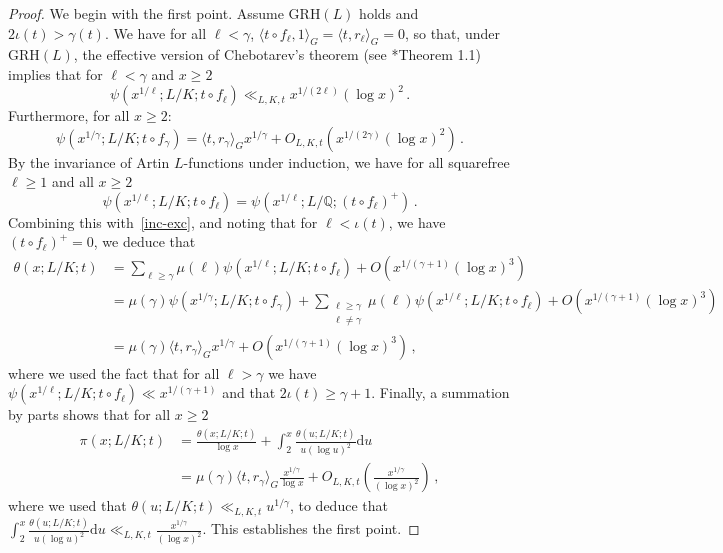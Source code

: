 \documentclass[12pt]{amsart}
\numberwithin{equation}{section}
\newcommand{\Q}{\mathbb Q}
\theoremstyle{definition}
\theoremstyle{remark}
\begin{document}
\begin{proof} 
We begin with the first point. Assume $\mathrm{GRH}(L)$ holds and $2\iota(t) > \gamma(t)$. We have for all $\ell<\gamma$, $\langle t\circ f_\ell,1\rangle_G=\langle t,r_\ell\rangle_G=0$, so that, under $\mathrm{GRH}(L)$, the effective version of Chebotarev's theorem (see \cite{LO}*{Theorem 1.1}) implies that for $\ell<\gamma$ and $x\ge 2$
\[ \psi\left(x^{1/\ell};L/K;t\circ f_\ell\right)\ll_{L,K,t} x^{1/(2\ell)}(\log x)^2\, .\]
Furthermore, for all $x\ge 2$: 
\[\psi\left(x^{1/\gamma};L/K;t\circ f_\gamma\right)=\langle t,r_\gamma\rangle_G x^{1/\gamma}+O_{L,K,t}\left(x^{1/(2\gamma)}(\log x)^2\right)\, .\]
By the invariance of Artin $L$-functions under induction, we have for all squarefree $\ell\ge 1$ and all $x\ge 2$ \[\psi\left(x^{1/\ell};L/K;t\circ f_\ell\right)=\psi\left(x^{1/\ell};L/\Q;(t\circ f_\ell)^+\right)\, .\]
Combining this with~\eqref{inc-exc}, and noting that for $\ell< \iota(t)$, we have $(t\circ f_\ell)^+=0$, we deduce that
\begin{align*}
    \theta(x;L/K;t)&=\sum_{\ell\ge \gamma} \mu(\ell)\psi\left(x^{1/\ell};L/K;t\circ f_\ell\right)+O\left(x^{1/(\gamma+1)}(\log x)^3\right)\\
    &=\mu(\gamma)\psi\left(x^{1/\gamma};L/K;t\circ f_\gamma\right)+\sum_{\substack{\ell\ge \gamma \\ \ell\ne \gamma}} \mu(\ell)\psi\left(x^{1/\ell};L/K;t\circ f_\ell\right)+O\left(x^{1/(\gamma+1)}(\log x)^3\right)\\
    &=\mu(\gamma)\langle t,r_\gamma\rangle_G x^{1/\gamma}+O\left(x^{1/(\gamma+1)}(\log x)^3\right)\, ,
\end{align*}
where we used the fact that for all $\ell>\gamma$ we have $\psi\left(x^{1/\ell};L/K;t\circ f_\ell\right)\ll x^{1/(\gamma+1)}$ and that $2\iota(t)\ge \gamma+1$. Finally, a summation by parts shows that for all $x\ge 2$
\begin{align*}
    \pi(x;L/K;t)&=\frac{\theta(x;L/K;t)}{\log x}+\int_2^x\frac{\theta(u;L/K;t)}{u(\log u)^2}\mathrm{d}u\\
    &=\mu(\gamma)\langle t,r_\gamma\rangle_G \frac{x^{1/\gamma}}{\log x}+ O_{L,K,t}\left(\frac{x^{1/\gamma}}{(\log x)^2}\right)\, ,
\end{align*}
where we used that $\theta(u;L/K;t)\ll_{L,K,t} u^{1/\gamma}$, to deduce that $\int_2^x\frac{\theta(u;L/K;t)}{u(\log u)^2}\mathrm{d}u\ll_{L,K,t} \frac{x^{1/\gamma}}{(\log x)^2} $. This establishes the first point.


\end{proof}
\end{document}
